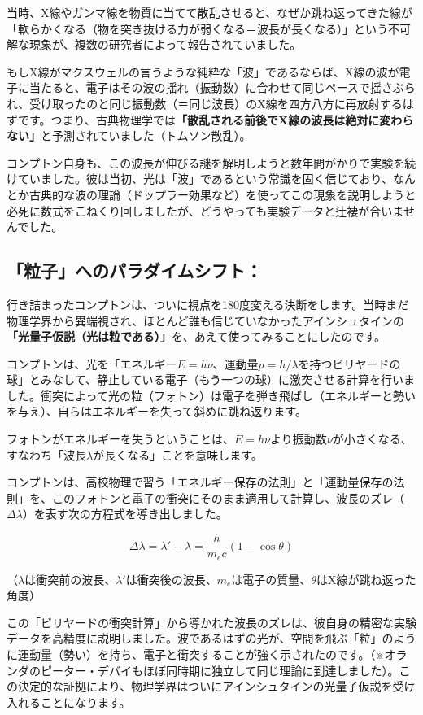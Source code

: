 当時、X線やガンマ線を物質に当てて散乱させると、なぜか跳ね返ってきた線が「軟らかくなる（物を突き抜ける力が弱くなる＝波長が長くなる）」という不可解な現象が、複数の研究者によって報告されていました。

もしX線がマクスウェルの言うような純粋な「波」であるならば、X線の波が電子に当たると、電子はその波の揺れ（振動数）に合わせて同じペースで揺さぶられ、受け取ったのと同じ振動数（＝同じ波長）のX線を四方八方に再放射するはずです。つまり、古典物理学では\textbf{「散乱される前後でX線の波長は絶対に変わらない」}と予測されていました（トムソン散乱）。

コンプトン自身も、この波長が伸びる謎を解明しようと数年間がかりで実験を続けていました。彼は当初、光は「波」であるという常識を固く信じており、なんとか古典的な波の理論（ドップラー効果など）を使ってこの現象を説明しようと必死に数式をこねくり回しましたが、どうやっても実験データと辻褄が合いませんでした。

\subsection{「粒子」へのパラダイムシフト：}

行き詰まったコンプトンは、ついに視点を180度変える決断をします。当時まだ物理学界から異端視され、ほとんど誰も信じていなかったアインシュタインの\textbf{「光量子仮説（光は粒である）」}を、あえて使ってみることにしたのです。

コンプトンは、光を「エネルギー\(E=h\nu\)、運動量\(p=h/\lambda\)を持つビリヤードの球」とみなして、静止している電子（もう一つの球）に激突させる計算を行いました。衝突によって光の粒（フォトン）は電子を弾き飛ばし（エネルギーと勢いを与え）、自らはエネルギーを失って斜めに跳ね返ります。

フォトンがエネルギーを失うということは、\(E=h\nu\)より振動数\(\nu\)が小さくなる、すなわち「波長\(\lambda\)が長くなる」ことを意味します。

コンプトンは、高校物理で習う「エネルギー保存の法則」と「運動量保存の法則」を、このフォトンと電子の衝突にそのまま適用して計算し、波長のズレ（\(\Delta \lambda\)）を表す次の方程式を導き出しました。

\[\Delta \lambda = \lambda' - \lambda = \frac{h}{m_e c} (1 - \cos\theta)\]

（\(\lambda\)は衝突前の波長、\(\lambda'\)は衝突後の波長、\(m_e\)は電子の質量、\(\theta\)はX線が跳ね返った角度）

この「ビリヤードの衝突計算」から導かれた波長のズレは、彼自身の精密な実験データを高精度に説明しました。波であるはずの光が、空間を飛ぶ「粒」のように運動量（勢い）を持ち、電子と衝突することが強く示されたのです。（※オランダのピーター・デバイもほぼ同時期に独立して同じ理論に到達しました）。この決定的な証拠により、物理学界はついにアインシュタインの光量子仮説を受け入れることになります。

